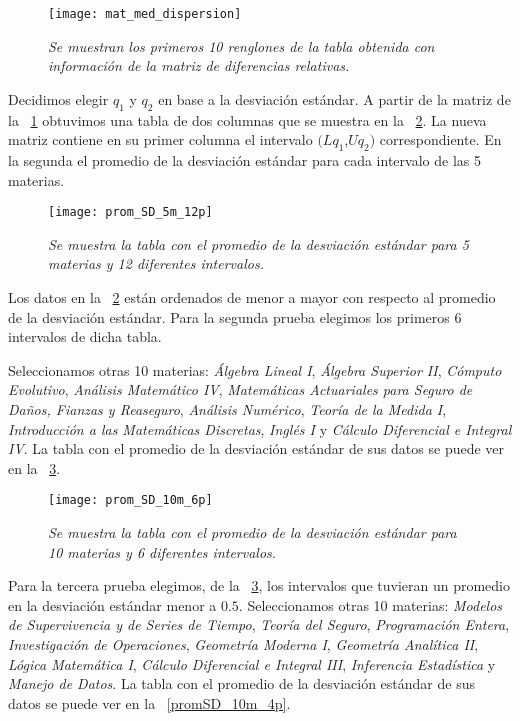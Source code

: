 \begin{figure}[H]
\centering
\texttt{[image: mat\_med\_dispersion]} %
\caption[\textit{Matriz con información por materia}]{\textit{Se muestran los primeros 10 renglones de la tabla obtenida con información de la matriz de diferencias relativas.}}\label{matMedDispersion}
\end{figure}


Decidimos elegir $q_{1}$ y $q_{2}$ en base a la desviación estándar. A partir de la matriz de la \figurename{~\ref{matMedDispersion}} obtuvimos una tabla de dos columnas que se muestra en la \figurename{~\ref{promSD_5m_12p}}. La nueva matriz contiene en su primer columna el intervalo $(Lq_{1}$,$Uq_{2})$ correspondiente. En la segunda el promedio de la desviación estándar para cada intervalo de las 5 materias.

\begin{figure}[h]
\centering
\texttt{[image: prom\_SD\_5m\_12p]} %
\caption[\textit{Promedio de la desviación estándar: 5 materias, 12 intervalos}]{\textit{Se muestra la tabla con el promedio de la desviación estándar para 5 materias y 12 diferentes intervalos.}}\label{promSD_5m_12p}
\end{figure}


Los datos en la \figurename{~\ref{promSD_5m_12p}} están ordenados de menor a mayor con respecto al promedio de la desviación estándar. Para la segunda prueba elegimos los primeros 6 intervalos de dicha tabla.

Seleccionamos otras 10 materias: \textit{Álgebra Lineal I}, \textit{Álgebra Superior II}, \textit{Cómputo Evolutivo}, \textit{Análisis Matemático IV}, \textit{Matemáticas Actuariales para Seguro de Daños, Fianzas y Reaseguro}, \textit{Análisis Numérico}, \textit{Teoría de la Medida I}, \textit{Introducción a las Matemáticas Discretas}, \textit{Inglés I} y \textit{Cálculo Diferencial e Integral IV}. La tabla con el promedio de la desviación estándar de sus datos se puede ver en la \figurename{~\ref{promSD_10m_6p}}.


\begin{figure}[H]
\centering
\texttt{[image: prom\_SD\_10m\_6p]} %
\caption[\textit{Promedio de la desviación estándar: 10 materias, 6 intervalos}]{\textit{Se muestra la tabla con el promedio de la desviación estándar para 10 materias y 6 diferentes intervalos.}}\label{promSD_10m_6p}
\end{figure}


Para la tercera prueba elegimos, de la \figurename{~\ref{promSD_10m_6p}}, los intervalos que tuvieran un promedio en la desviación estándar menor a $0.5$. Seleccionamos otras 10 materias: \textit{Modelos de Supervivencia y de Series de Tiempo}, \textit{Teoría del Seguro}, \textit{Programación Entera}, \textit{Investigación de Operaciones}, \textit{Geometría Moderna I}, \textit{Geometría Analítica II}, \textit{Lógica Matemática I}, \textit{Cálculo Diferencial e Integral III}, \textit{Inferencia Estadística} y \textit{Manejo de Datos}. La tabla con el promedio de la desviación estándar de sus datos se puede ver en la \figurename{~\ref{promSD_10m_4p}}.


